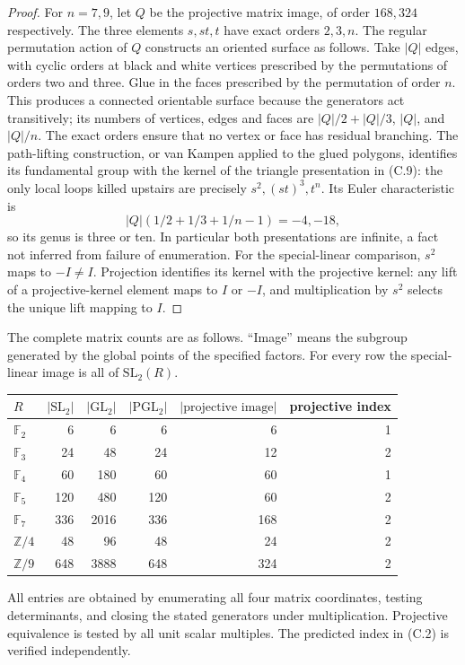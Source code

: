 \begin{proof}
For $n=7,9$, let $Q$ be the projective matrix image, of order
$168,324$ respectively. The three elements $s,st,t$ have exact
orders $2,3,n$. The regular permutation action of $Q$ constructs
an oriented surface as follows. Take $|Q|$ edges, with cyclic
orders at black and white vertices prescribed by the permutations
of orders two and three. Glue in the faces prescribed by the
permutation of order $n$. This produces a connected orientable
surface because the generators act transitively; its numbers of
vertices, edges and faces are $|Q|/2+|Q|/3$, $|Q|$, and $|Q|/n$.
The exact orders ensure that no vertex or face has residual
branching. The path-lifting construction, or van Kampen applied
to the glued polygons, identifies its fundamental group with
the kernel of the triangle presentation in (C.9): the only
local loops killed upstairs are precisely $s^2,(st)^3,t^n$.
Its Euler characteristic is
\[
 |Q|(1/2+1/3+1/n-1)=-4,-18,
\]
so its genus is three or ten. In particular both presentations
are infinite, a fact not inferred from failure of enumeration.
For the special-linear comparison, $s^2$ maps to $-I\ne I$.
Projection identifies its kernel with the projective kernel:
any lift of a projective-kernel element maps to $I$ or $-I$,
and multiplication by $s^2$ selects the unique lift mapping to $I$.
\end{proof}

The complete matrix counts are as follows. ``Image'' means the
subgroup generated by the global points of the specified factors.
For every row the special-linear image is all of $\mathrm{SL}_2(R)$.
\begin{center}
\begin{tabular}{lrrrrr}
\hline
$R$&$|\mathrm{SL}_2|$&$|\mathrm{GL}_2|$&$|\mathrm{PGL}_2|$
 &$|\text{projective image}|$&projective index\\ \hline
$\mathbb F_2$&6&6&6&6&1\\
$\mathbb F_3$&24&48&24&12&2\\
$\mathbb F_4$&60&180&60&60&1\\
$\mathbb F_5$&120&480&120&60&2\\
$\mathbb F_7$&336&2016&336&168&2\\
$\mathbb Z/4$&48&96&48&24&2\\
$\mathbb Z/9$&648&3888&648&324&2\\ \hline
\end{tabular}
\end{center}
All entries are obtained by enumerating all four matrix coordinates,
testing determinants, and closing the stated generators under
multiplication. Projective equivalence is tested by all unit scalar
multiples. The predicted index in (C.2) is verified independently.

